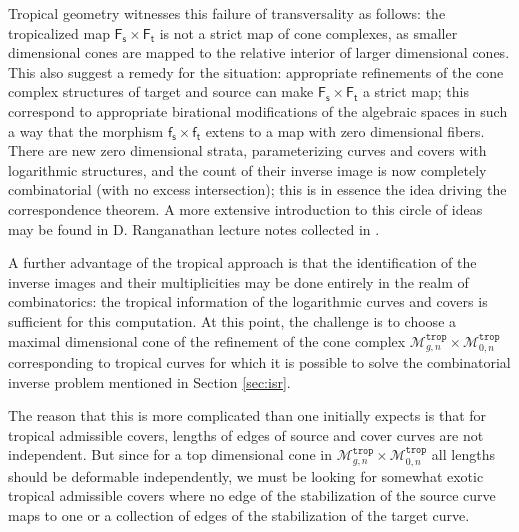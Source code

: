 \documentclass[11pt,reqno]{amsart}
\theoremstyle{definition}
\newcommand\trop{{\mathtt{trop}}}
\newcommand\Mgn[1]{\mathcal M_{#1}}
\newcommand{\Ft}{\mathsf{F_t}}
\newcommand{\Fs}{\mathsf{F_s}}
\newcommand{\ft}{\mathsf{f_t}}
\newcommand{\fs}{\mathsf{f_s}}
\begin{document}
Tropical geometry witnesses this failure of transversality as follows: the tropicalized map $\Fs\times \Ft$ is not a strict map of cone complexes, as smaller dimensional cones are mapped to the relative interior of larger dimensional cones. This also suggest a remedy for the situation: appropriate refinements of the cone complex structures of target and source can make $\Fs\times \Ft$ a strict map; this correspond to appropriate birational modifications of the algebraic spaces in such a way that the morphism $\fs\times \ft$ extens to a map with zero dimensional fibers. There are new zero
 dimensional strata, parameterizing curves and covers with logarithmic structures, and the count of their inverse image is now completely combinatorial (with no excess intersection); this is in essence the idea driving the correspondence theorem. A more extensive introduction to this circle of ideas may be found in D. Ranganathan lecture notes collected in \cite{F}. 

A further advantage of the tropical approach is that the identification of the inverse images and their multiplicities may be done entirely in the realm of combinatorics: the tropical information of the logarithmic curves and covers is sufficient for this computation. At this point, the challenge is to choose a maximal dimensional cone of the refinement of the cone complex $\Mgn{g,n}^\trop\times \Mgn{0,n}^\trop$ corresponding to tropical curves for which it is possible to solve the combinatorial inverse problem mentioned in Section \ref{sec:isr}.

The reason that this is more complicated than one initially expects is that for  tropical admissible covers, lengths of edges of source and cover curves are not independent. But since for a top dimensional cone in $\Mgn{g,n}^\trop\times \Mgn{0,n}^\trop$ all lengths should be deformable independently, we must be looking for somewhat exotic tropical admissible covers where no edge of the stabilization of the source curve maps to one or a collection of edges of the stabilization of the target curve.
\end{document}
